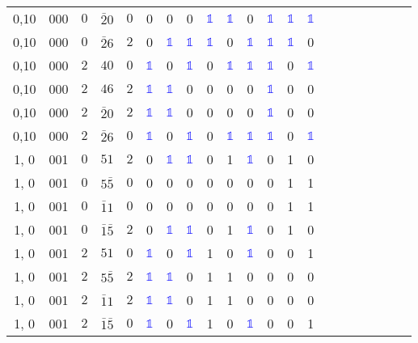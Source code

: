 \begin{longtable*}{c| cccccccccccccccccccc }
0,10& 000& $0$& $\bar{2}0$& $0$& 0& 0& 0& \textcolor{blue}{$\mathds{1}$}& \textcolor{blue}{$\mathds{1}$}& 0& \textcolor{blue}{$\mathds{1}$}& \textcolor{blue}{$\mathds{1}$}& \textcolor{blue}{$\mathds{1}$}\\
0,10& 000& $0$& $\bar{2}6$& $2$& 0& \textcolor{blue}{$\mathds{1}$}& \textcolor{blue}{$\mathds{1}$}& \textcolor{blue}{$\mathds{1}$}& 0& \textcolor{blue}{$\mathds{1}$}& \textcolor{blue}{$\mathds{1}$}& \textcolor{blue}{$\mathds{1}$}& 0\\
0,10& 000& $2$& $40$& $0$& \textcolor{blue}{$\mathds{1}$}& 0& \textcolor{blue}{$\mathds{1}$}& 0& \textcolor{blue}{$\mathds{1}$}& \textcolor{blue}{$\mathds{1}$}& \textcolor{blue}{$\mathds{1}$}& 0& \textcolor{blue}{$\mathds{1}$}\\
0,10& 000& $2$& $46$& $2$& \textcolor{blue}{$\mathds{1}$}& \textcolor{blue}{$\mathds{1}$}& 0& 0& 0& 0& \textcolor{blue}{$\mathds{1}$}& 0& 0\\
0,10& 000& $2$& $\bar{2}0$& $2$& \textcolor{blue}{$\mathds{1}$}& \textcolor{blue}{$\mathds{1}$}& 0& 0& 0& 0& \textcolor{blue}{$\mathds{1}$}& 0& 0\\
0,10& 000& $2$& $\bar{2}6$& $0$& \textcolor{blue}{$\mathds{1}$}& 0& \textcolor{blue}{$\mathds{1}$}& 0& \textcolor{blue}{$\mathds{1}$}& \textcolor{blue}{$\mathds{1}$}& \textcolor{blue}{$\mathds{1}$}& 0& \textcolor{blue}{$\mathds{1}$}\\
1, 0& 001& $0$& $51$& $2$& 0& \textcolor{blue}{$\mathds{1}$}& \textcolor{blue}{$\mathds{1}$}& 0& 1& \textcolor{blue}{$\mathds{1}$}& 0& 1& 0\\
1, 0& 001& $0$& $5\bar{5}$& $0$& 0& 0& 0& 0& 0& 0& 0& 1& 1\\
1, 0& 001& $0$& $\bar{1}1$& $0$& 0& 0& 0& 0& 0& 0& 0& 1& 1\\
1, 0& 001& $0$& $\bar{1}\bar{5}$& $2$& 0& \textcolor{blue}{$\mathds{1}$}& \textcolor{blue}{$\mathds{1}$}& 0& 1& \textcolor{blue}{$\mathds{1}$}& 0& 1& 0\\
1, 0& 001& $2$& $51$& $0$& \textcolor{blue}{$\mathds{1}$}& 0& \textcolor{blue}{$\mathds{1}$}& 1& 0& \textcolor{blue}{$\mathds{1}$}& 0& 0& 1\\
1, 0& 001& $2$& $5\bar{5}$& $2$& \textcolor{blue}{$\mathds{1}$}& \textcolor{blue}{$\mathds{1}$}& 0& 1& 1& 0& 0& 0& 0\\
1, 0& 001& $2$& $\bar{1}1$& $2$& \textcolor{blue}{$\mathds{1}$}& \textcolor{blue}{$\mathds{1}$}& 0& 1& 1& 0& 0& 0& 0\\
1, 0& 001& $2$& $\bar{1}\bar{5}$& $0$& \textcolor{blue}{$\mathds{1}$}& 0& \textcolor{blue}{$\mathds{1}$}& 1& 0& \textcolor{blue}{$\mathds{1}$}& 0& 0& 1\\

\end{longtable*}
